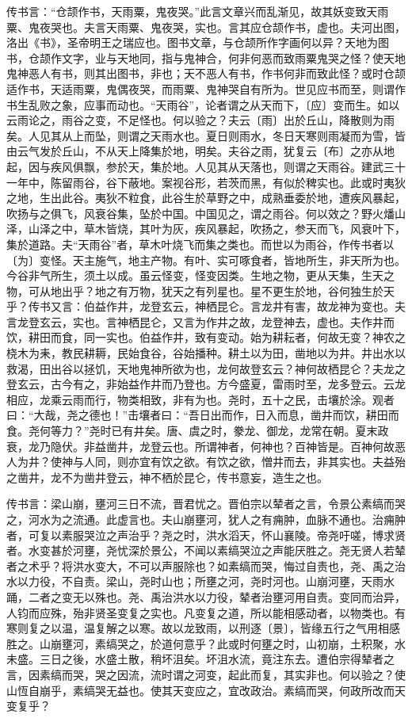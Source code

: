 \documentclass[]{article}
\begin{document}
传书言：``仓颉作书，天雨粟，鬼夜哭。''此言文章兴而乱渐见，故其妖变致天雨粟、鬼夜哭也。夫言天雨粟、鬼夜哭，实也。言其应仓颉作书，虚也。夫河出图，洛出《书》，圣帝明王之瑞应也。图书文章，与仓颉所作字画何以异？天地为图书，仓颉作文字，业与天地同，指与鬼神合，何非何恶而致雨粟鬼哭之怪？使天地鬼神恶人有书，则其出图书，非也；天不恶人有书，作书何非而致此怪？或时仓颉适作书，天适雨粟，鬼偶夜哭，而雨粟、鬼神哭自有所为。世见应书而至，则谓作书生乱败之象，应事而动也。``天雨谷''，论者谓之从天而下，〔应〕变而生。如以云雨论之，雨谷之变，不足怪也。何以验之？夫云〔雨〕出於丘山，降散则为雨矣。人见其从上而坠，则谓之天雨水也。夏日则雨水，冬日天寒则雨凝而为雪，皆由云气发於丘山，不从天上降集於地，明矣。夫谷之雨，犹复云〔布〕之亦从地起，因与疾风俱飘，参於天，集於地。人见其从天落也，则谓之天雨谷。建武三十一年中，陈留雨谷，谷下蔽地。案视谷形，若茨而黑，有似於稗实也。此或时夷狄之地，生出此谷。夷狄不粒食，此谷生於草野之中，成熟垂委於地，遭疾风暴起，吹扬与之俱飞，风衰谷集，坠於中国。中国见之，谓之雨谷。何以效之？野火燔山泽，山泽之中，草木皆烧，其叶为灰，疾风暴起，吹扬之，参天而飞，风衰叶下，集於道路。夫``天雨谷''者，草木叶烧飞而集之类也。而世以为雨谷，作传书者以〔为〕变怪。天主施气，地主产物。有叶、实可啄食者，皆地所生，非天所为也。今谷非气所生，须土以成。虽云怪变，怪变因类。生地之物，更从天集，生天之物，可从地出乎？地之有万物，犹天之有列星也。星不更生於地，谷何独生於天乎？传书又言：伯益作井，龙登玄云，神栖昆仑。言龙井有害，故龙神为变也。夫言龙登玄云，实也。言神栖昆仑，又言为作井之故，龙登神去，虚也。夫作井而饮，耕田而食，同一实也。伯益作井，致有变动。始为耕耘者，何故无变？神农之桡木为耒，教民耕耨，民始食谷，谷始播种。耕土以为田，凿地以为井。井出水以救渴，田出谷以拯饥，天地鬼神所欲为也，龙何故登玄云？神何故栖昆仑？夫龙之登玄云，古今有之，非始益作井而乃登也。方今盛夏，雷雨时至，龙多登云。云龙相应，龙乘云雨而行，物类相致，非有为也。尧时，五十之民，击壤於涂。观者曰：``大哉，尧之德也！''击壤者曰：``吾日出而作，日入而息，凿井而饮，耕田而食。尧何等力？''尧时已有井矣。唐、虞之时，豢龙、御龙，龙常在朝。夏末政衰，龙乃隐伏。非益凿井，龙登云也。所谓神者，何神也？百神皆是。百神何故恶人为井？使神与人同，则亦宜有饮之欲。有饮之欲，憎井而去，非其实也。夫益殆之凿井，龙不为凿井登云，神不栖於昆仑，传书意妄，造生之也。

传书言：梁山崩，壅河三日不流，晋君忧之。晋伯宗以辇者之言，令景公素缟而哭之，河水为之流通。此虚言也。夫山崩壅河，犹人之有痈肿，血脉不通也。治痈肿者，可复以素服哭泣之声治乎？尧之时，洪水滔天，怀山襄陵。帝尧吁嗟，博求贤者。水变甚於河壅，尧忧深於景公，不闻以素缟哭泣之声能厌胜之。尧无贤人若辇者之术乎？将洪水变大，不可以声服除也？如素缟而哭，悔过自责也，尧、禹之治水以力役，不自责。梁山，尧时山也；所壅之河，尧时河也。山崩河壅，天雨水踊，二者之变无以殊也。尧、禹治洪水以力役，辇者治壅河用自责。变同而治异，人钧而应殊，殆非贤圣变复之实也。凡变复之道，所以能相感动者，以物类也。有寒则复之以温，温复解之以寒。故以龙致雨，以刑逐〔景〕，皆缘五行之气用相感胜之。山崩壅河，素缟哭之，於道何意乎？此或时何壅之时，山初崩，土积聚，水未盛。三日之後，水盛土散，稍坏沮矣。坏沮水流，竟注东去。遭伯宗得辇者之言，因素缟而哭，哭之因流，流时谓之河变，起此而复，其实非也。何以验之？使山恆自崩乎，素缟哭无益也。使其天变应之，宜改政治。素缟而哭，何政所改而天变复乎？
\end{document}
